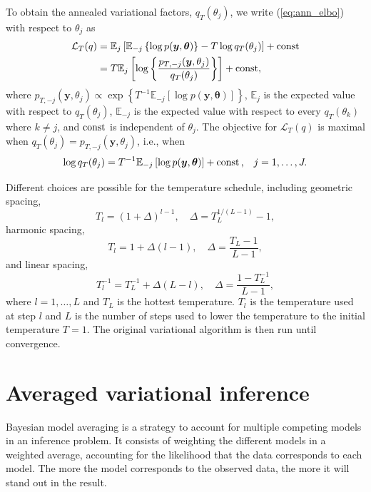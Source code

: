 \documentclass[a4paper, 11pt]{report}
\numberwithin{equation}{chapter}
\DeclareMathOperator*{\const}{{\rm const}}
\begin{document}
To obtain the annealed variational factors, $q_T(\theta_j)$, we write (\ref{eq:ann_elbo}) with respect to $\theta_j$ as
\begin{align*}
\mathcal{L}_T(q) &= \mathbb{E}_j\left[\mathbb{E}_{-j}\left\lbrace \log p(\boldsymbol{y},\boldsymbol{\theta})\right\rbrace - T \log q_T(\theta_j)\right]+ \const\\
&= T\mathbb{E}_j\left[\log\left\lbrace\frac{p_{T, -j}(\boldsymbol{y}, \theta_j)}{q_T(\theta_j)}\right\rbrace\right] + \const,	
\end{align*}
where $p_{T, -j}(\boldsymbol{y},\theta_j) \propto \exp\left\lbrace T^{-1}\mathbb{E}_{-j}\left[\log p(\boldsymbol{y},\boldsymbol{\theta})\right]\right\rbrace$, $\mathbb{E}_j$ is the expected value with respect to $q_T(\theta_j)$, $\mathbb{E}_{-j}$ is the expected value with respect to every $ q_T(\theta_k)$ where $k \neq j$, and $\const$ is independent of $\theta_j$. The objective for $\mathcal{L}_T(q)$ is maximal when $q_T(\theta_j) = p_{T,-j}(\boldsymbol{y},\theta_j)$, i.e., when
\begin{equation*}
\log q_T(\theta_j) = T^{-1} \mathbb{E}_{-j}\left[\log p(\boldsymbol{y}, \boldsymbol{\theta})\right] + \const\text{,}\quad j=1,\dots,J.
\end{equation*}

Different choices are possible for the temperature schedule, including geometric spacing,
\begin{equation*}
T_l = (1 + \Delta)^{l-1},\quad \Delta = T_L^{1/(L-1)}-1,
\end{equation*}
harmonic spacing,
\begin{equation*}
T_l = 1 + \Delta(l-1), \quad \Delta =\frac{T_L-1}{L-1},
\end{equation*}
and linear spacing,
\begin{equation*}
T_l^{-1} = T_L^{-1} + \Delta (L-l), \quad \Delta = \frac{1-T_L^{-1}}{L-1},
\end{equation*}
where $l = 1,\dots,L$ and $T_L$ is the hottest temperature. $T_l$ is the temperature used at step $l$ and $L$ is the number of steps used to lower the temperature to the initial temperature $T = 1$. The original variational algorithm is then run until convergence.
\section{Averaged variational inference} \label{sec:var_inf}
Bayesian model averaging is a strategy to account for multiple competing models in an inference problem. It consists of weighting the different models in a weighted average, accounting for the likelihood that the data corresponds to each model. The more the model corresponds to the observed data, the more it will stand out in the result.
\end{document}
